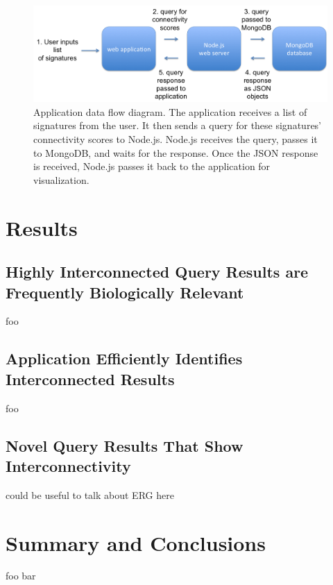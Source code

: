 \documentclass[12pt]{article}
\begin{document}
\begin{figure}[h]
\centering
\includegraphics[scale=0.5]{img/app_data_flow.png}
\caption{ Application data flow diagram. The application receives a list of signatures from the user. It then sends a query for these signatures' connectivity scores to Node.js. Node.js receives the query, passes it to MongoDB, and waits for the response. Once the JSON response is received, Node.js passes it back to the application for visualization.}
\label{fig:app_data_flow}
\end{figure}


\section{Results}

\subsection{Highly Interconnected Query Results are Frequently Biologically Relevant}
foo

\subsection{Application Efficiently Identifies Interconnected Results}
foo

\subsection{Novel Query Results That Show Interconnectivity}
could be useful to talk about ERG here



\section{Summary and Conclusions}
foo bar



\end{document}
